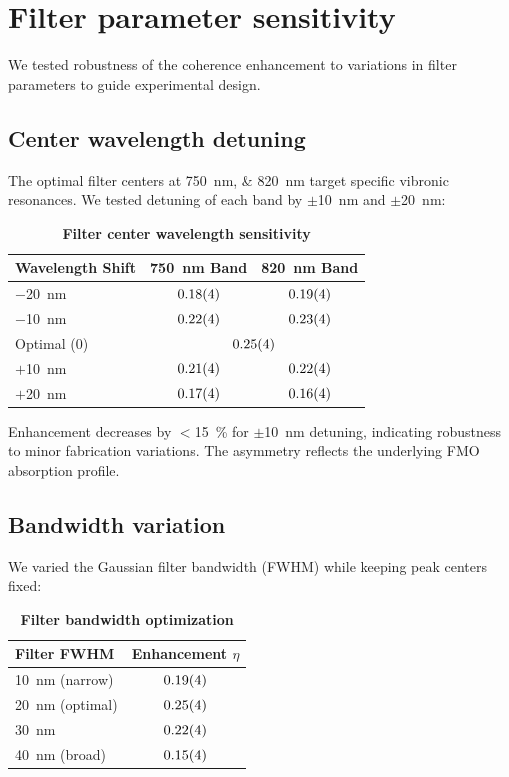 \documentclass[11pt,a4paper]{article}
\begin{document}
\section{Filter parameter sensitivity}
\label{sec:S9}

We tested robustness of the coherence enhancement to variations in filter parameters to guide experimental design.

\subsection{Center wavelength detuning}

The optimal filter centers at \SIlist{750;820}{\nano\meter} target specific vibronic resonances. We tested detuning of each band by $\pm$\SI{10}{\nano\meter} and $\pm$\SI{20}{\nano\meter}:

\begin{table}[htb]
\centering
\caption{\textbf{Filter center wavelength sensitivity}}
\label{tab:SI_wavelength}
\begin{tabular}{lcc}
\toprule
\textbf{Wavelength Shift} & \textbf{750~nm Band} & \textbf{820~nm Band} \\
\midrule
$-$\SI{20}{\nano\meter} & $\num{0.18 \pm 0.04}$ & $\num{0.19 \pm 0.04}$ \\
$-$\SI{10}{\nano\meter} & $\num{0.22 \pm 0.04}$ & $\num{0.23 \pm 0.04}$ \\
Optimal (0) & \multicolumn{2}{c}{$\num{0.25 \pm 0.04}$} \\
$+$\SI{10}{\nano\meter} & $\num{0.21 \pm 0.04}$ & $\num{0.22 \pm 0.04}$ \\
$+$\SI{20}{\nano\meter} & $\num{0.17 \pm 0.04}$ & $\num{0.16 \pm 0.04}$ \\
\bottomrule
\end{tabular}
\end{table}

Enhancement decreases by $<$\SI{15}{\percent} for $\pm$\SI{10}{\nano\meter} detuning, indicating robustness to minor fabrication variations. The asymmetry reflects the underlying FMO absorption profile.

\subsection{Bandwidth variation}

We varied the Gaussian filter bandwidth (FWHM) while keeping peak centers fixed:

\begin{table}[htb]
\centering
\caption{\textbf{Filter bandwidth optimization}}
\label{tab:SI_bandwidth}
\begin{tabular}{lc}
\toprule
\textbf{Filter FWHM} & \textbf{Enhancement $\eta$} \\
\midrule
\SI{10}{\nano\meter} (narrow) & $\num{0.19 \pm 0.04}$ \\
\SI{20}{\nano\meter} (optimal) & $\num{0.25 \pm 0.04}$ \\
\SI{30}{\nano\meter} & $\num{0.22 \pm 0.04}$ \\
\SI{40}{\nano\meter} (broad) & $\num{0.15 \pm 0.04}$ \\
\bottomrule
\end{tabular}
\end{table}
\end{document}
